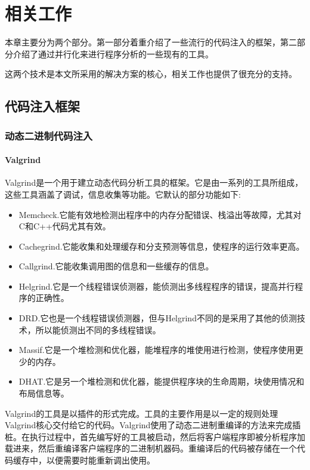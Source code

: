 
\chapter{相关工作}

本章主要分为两个部分。第一部分着重介绍了一些流行的代码注入的框架，第二部分介绍了通过并行化来进行程序分析的一些现有的工具。

这两个技术是本文所采用的解决方案的核心，相关工作也提供了很充分的支持。

\section{代码注入框架}
\subsection{动态二进制代码注入}
\subsubsection{Valgrind}

Valgrind\cite{valgrind}是一个用于建立动态代码分析工具的框架。它是由一系列的工具所组成，这些工具涵盖了调试，信息收集等功能。它默认的部分功能如下:

\begin{itemize}
	\item Memcheck.它能有效地检测出程序中的内存分配错误、栈溢出等故障，尤其对C和C++代码尤其有效。
	\item Cachegrind.它能收集和处理缓存和分支预测等信息，使程序的运行效率更高。
	\item Callgrind.它能收集调用图的信息和一些缓存的信息。
	\item Helgrind.它是一个线程错误侦测器，能侦测出多线程程序的错误，提高并行程序的正确性。
	\item DRD.它也是一个线程错误侦测器，但与Helgrind不同的是采用了其他的侦测技术，所以能侦测出不同的多线程错误。
	\item Massif.它是一个堆检测和优化器，能堆程序的堆使用进行检测，使程序使用更少的内存。
	\item DHAT.它是另一个堆检测和优化器，能提供程序块的生命周期，块使用情况和布局信息等。
\end{itemize}

Valgrind的工具是以插件的形式完成。工具的主要作用是以一定的规则处理Valgrind核心交付给它的代码。Valgrind使用了动态二进制重编译的方法来完成插桩。在执行过程中，首先编写好的工具被启动，然后将客户端程序即被分析程序加载进来，然后重编译客户端程序的二进制机器码。重编译后的代码被存储在一个代码缓存中，以便需要时能重新调出使用。

